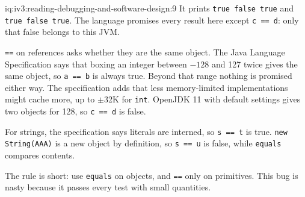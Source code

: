 \begin{solution}{iq:iv3:reading-debugging-and-software-design:9}
It prints \texttt{true false true} and \texttt{true false true}. The language promises every result here except \texttt{c == d}: only that false belongs to this JVM.

\texttt{==} on references asks whether they are the same object. The Java Language Specification says that boxing an integer between $-128$ and 127 twice gives the same object, so \texttt{a == b} is always true. Beyond that range nothing is promised either way. The specification adds that less memory-limited implementations might cache more, up to $\pm$32K for \texttt{int}. OpenJDK 11 with default settings gives two objects for 128, so \texttt{c == d} is false.

For strings, the specification says literals are interned, so \texttt{s == t} is true. \texttt{new String(\textquotedbl{}AAA\textquotedbl{})} is a new object by definition, so \texttt{s == u} is false, while \texttt{equals} compares contents.

The rule is short: use \texttt{equals} on objects, and \texttt{==} only on primitives. This bug is nasty because it passes every test with small quantities.


\end{solution}

